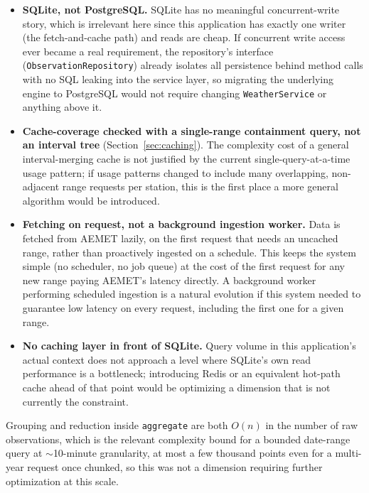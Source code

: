 \documentclass[11pt,a4paper]{article}
\begin{document}
\begin{itemize}[nosep]
    \item \textbf{SQLite, not PostgreSQL.} SQLite has no meaningful
    concurrent-write story, which is irrelevant here since this
    application has exactly one writer (the fetch-and-cache path) and
    reads are cheap. If concurrent write access ever became a real
    requirement, the repository's interface (\texttt{ObservationRepository})
    already isolates all persistence behind method calls with no SQL
    leaking into the service layer, so migrating the underlying engine to
    PostgreSQL would not require changing \texttt{WeatherService} or
    anything above it.
    \item \textbf{Cache-coverage checked with a single-range containment
    query, not an interval tree} (Section~\ref{sec:caching}). The
    complexity cost of a general interval-merging cache is not justified
    by the current single-query-at-a-time usage pattern; if usage patterns
    changed to include many overlapping, non-adjacent range requests
    per station, this is the first place a more general algorithm would
    be introduced.
    \item \textbf{Fetching on request, not a background ingestion
    worker.} Data is fetched from AEMET lazily, on the first request that
    needs an uncached range, rather than proactively ingested on a
    schedule. This keeps the system simple (no scheduler, no job queue) at
    the cost of the first request for any new range paying AEMET's
    latency directly. A background worker performing scheduled ingestion
    is a natural evolution if this system needed to guarantee low latency
    on every request, including the first one for a given range.
    \item \textbf{No caching layer in front of SQLite.} Query volume in
    this application's actual context does not approach a level where
    SQLite's own read performance is a bottleneck; introducing Redis or an
    equivalent hot-path cache ahead of that point would be optimizing a
    dimension that is not currently the constraint.
\end{itemize}

Grouping and reduction inside \texttt{aggregate} are both $O(n)$ in the
number of raw observations, which is the relevant complexity bound for a
bounded date-range query at $\sim$10-minute granularity, at most a few
thousand points even for a multi-year request once chunked, so this was
not a dimension requiring further optimization at this scale.
\end{document}
